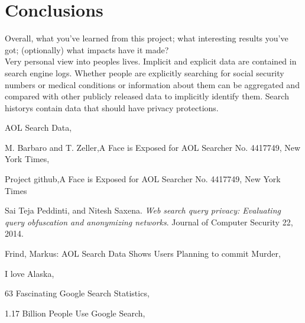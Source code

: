\documentclass{article}
\begin{document}
\section{Conclusions}
Overall, what you've learned from this project; what interesting results you've got; (optionally) what impacts have it made?\\

Very personal view into peoples lives. Implicit and explicit data are contained in search engine logs. Whether people are explicitly searching for social security numbers or medical conditions or information about them can be aggregated and compared with other publicly released data to implicitly identify them. Search historys contain data that should have privacy protections. 

\begin{thebibliography}{9}
AOL Search Data,
\\

M. Barbaro and T. Zeller,A Face is Exposed for AOL Searcher No. 4417749, New York Times,
\\

Project github,A Face is Exposed for AOL Searcher No. 4417749, New York Times
\\

Sai Teja Peddinti, and Nitesh Saxena. 
\textit{Web search query privacy: Evaluating query obfuscation and anonymizing networks}. 
Journal of Computer Security 22, 2014.
 
Frind, Markus: AOL Search Data Shows Users Planning to commit Murder,
\\

I love Alaska,
\\

63 Fascinating Google Search Statistics,
\\

1.17 Billion People Use Google Search,
\\

\end{thebibliography}
\end{document}
